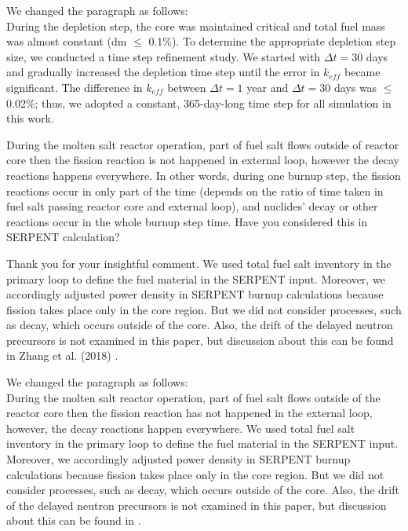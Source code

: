 \documentclass[answers,11pt]{exam}
\begin{document}
\begin{questions}
\begin{solution}
        		  We changed the paragraph as follows:\\
        		  During the depletion step, the core was maintained critical and total fuel mass was almost constant (dm $\leq$ 0.1\%). To determine the appropriate depletion step size, we conducted a time step refinement study. We started with $\Delta t=30$ days and gradually increased the depletion time step until the error in $k_{eff}$ became significant. The difference in $k_{eff}$ between $\Delta t=1$ year and $\Delta t=30$ days was $\leq$ 0.02\%; thus, we adopted a constant, 365-day-long time step for all simulation in this work.
        		    
        \end{solution}

        \question During the molten salt reactor operation, part of fuel salt flows outside of reactor core then the fission reaction is not happened in external loop, however the decay reactions happens everywhere. In other words, during one burnup step, the fission reactions occur in only part of the time (depends on the ratio of time taken in fuel salt passing reactor core and external loop), and nuclides' decay or other reactions occur in the whole burnup step time. Have you considered this in SERPENT calculation?  
        \begin{solution}
		          
		          Thank you for your insightful comment. We used total fuel 
		          salt inventory in the primary loop to define the fuel 
		          material in the SERPENT input. Moreover, we accordingly 
		          adjusted power density in SERPENT burnup calculations 
		          because fission takes place only in the core region. But we did not consider processes, such as decay, which occurs outside of the core. Also, the drift of the delayed neutron precursors is not examined in this paper, but discussion about this can be found in Zhang et al. (2018) \cite{zhang2018review}.
		          
		          We changed the paragraph as follows:\\    
		          
		          During the molten salt reactor operation, part of fuel salt flows outside of the reactor core then the fission reaction has not happened in the external loop, however, the decay reactions happen everywhere. We used total fuel salt inventory in the primary loop to define the fuel material in the SERPENT input. Moreover, we accordingly adjusted power density in SERPENT burnup calculations because fission takes place only in the core region. But we did not consider processes, such as decay, which occurs outside of the core. Also, the drift of the delayed neutron precursors is not examined in this paper, but discussion about this can be found in \cite{zhang2018review}.     
        \end{solution}


\end{questions}
\end{document}
